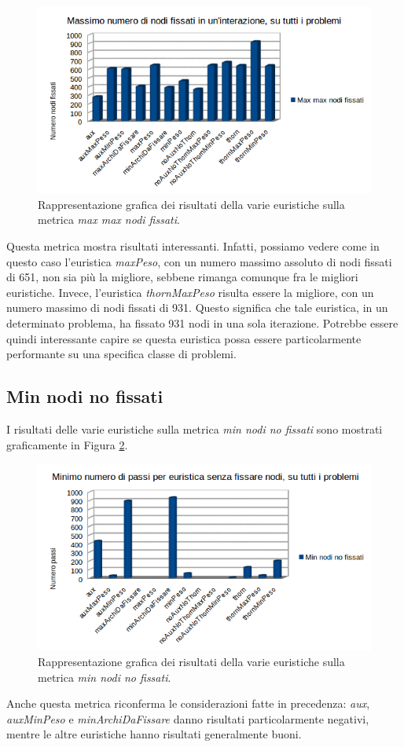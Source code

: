 \begin{figure}[H]
\includegraphics[width=\textwidth]{res/img/maxMaxNodiFissati.png}
\caption{Rappresentazione grafica dei risultati della varie euristiche sulla metrica \textit{max max nodi fissati}.}
\label{fig:maxMaxNodiFissati}
\end{figure}

Questa metrica mostra risultati interessanti. Infatti, possiamo vedere come in questo caso l'euristica \textit{maxPeso}, con un numero massimo assoluto di nodi fissati di 651, non sia più la migliore, sebbene rimanga comunque fra le migliori euristiche. Invece, l'euristica \textit{thornMaxPeso} risulta essere la migliore, con un numero massimo di nodi fissati di 931. Questo significa che tale euristica, in un determinato problema, ha fissato 931 nodi in una sola iterazione. Potrebbe essere quindi interessante capire se questa euristica possa essere particolarmente performante su una specifica classe di problemi.

\subsection{Min nodi no fissati}
I risultati delle varie euristiche sulla metrica \textit{min nodi no fissati} sono mostrati graficamente in Figura \ref{fig:minNodiNoFissati}.

\begin{figure}[H]
\includegraphics[width=\textwidth]{res/img/minNodiNoFissati.png}
\caption{Rappresentazione grafica dei risultati della varie euristiche sulla metrica \textit{min nodi no fissati}.}
\label{fig:minNodiNoFissati}
\end{figure}

Anche questa metrica riconferma le considerazioni fatte in precedenza: \textit{aux}, \textit{auxMinPeso} e \textit{minArchiDaFissare} danno risultati particolarmente negativi, mentre le altre euristiche hanno risultati generalmente buoni. 